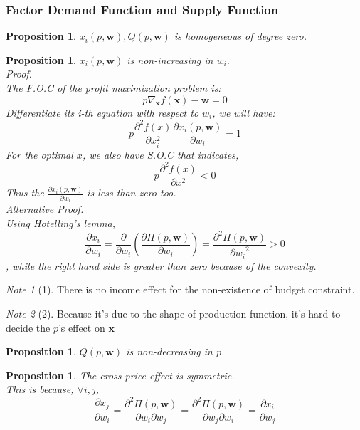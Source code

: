 \documentclass{article}
\theoremstyle{plain}
\newtheorem{prop}[thm]{Proposition}
\theoremstyle{definition}
\theoremstyle{remark}
\newtheorem*{note}{Note}
\begin{document}
\subsubsection{Factor Demand Function and Supply Function}
\begin{prop}
$x_i(p,\bm{w}), Q(p,\bm{w})$ is homogeneous of degree zero.
\end{prop}
\begin{prop}
$x_i(p,\bm{w})$ is non-increasing in $w_i$.\\
Proof.\\
 The F.O.C of the profit maximization problem is:
\begin{equation}
	p \nabla_{\bm{x}} f(\bm{x}) - \bm{w} = 0
\end{equation}
Differentiate its i-th equation with respect to $w_i$, we will have:
\begin{equation}
	p \frac{ \partial^2 f(x)}{\partial  x_i^2} \frac{\partial x_i(p,\bm{w})}{\partial w_i} = 1
\end{equation}
For the optimal $x$, we also have S.O.C that indicates,
\begin{equation}
	p \frac{\partial^2 f(x)}{\partial x^2}<0
\end{equation}
Thus the $\frac{\partial x_i(p,\bm{w})}{\partial w_i}$ is less than zero too.\\
Alternative Proof.\\
Using Hotelling's lemma, 
\begin{equation}
	\frac{\partial x_i}{\partial w_i} = \frac{\partial}{\partial w_i}(\frac{\partial \Pi(p, \bm{w})}{\partial w_i}) = \frac{\partial^2 \Pi(p, \bm{w})}{{\partial w_i}^2}>0
\end{equation}
, while the right hand side is greater than zero because of the convexity.

\end{prop}
\begin{note}[1]
There is no income effect for the non-existence of budget constraint.
\end{note}
\begin{note}[2]
Because it's due to the shape of production function, it's hard to decide the $p$'s effect on $\bm{x}$
\end{note}
\begin{prop}
$Q(p,\bm{w})$ is non-decreasing in $p$.
\end{prop}

\begin{prop}
The cross price effect is symmetric.\\
This is because, $\forall i,j$,
\begin{equation}
	\frac{\partial x_j}{\partial w_i} = \frac{\partial^2 \Pi(p, \bm{w})} {\partial w_i \partial w_j}=\frac{\partial^2 \Pi(p, \bm{w})} {\partial w_j \partial w_i} = \frac{\partial x_i}{\partial w_j}
\end{equation}
\end{prop}
\end{document}
